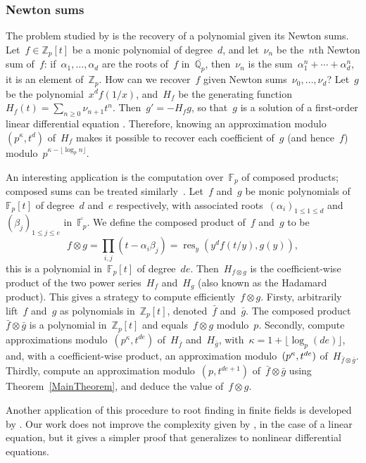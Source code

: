 \documentclass{sig-alternate}
\theoremstyle{definition}
\theoremstyle{remark}
\newcommand{\Zp}{\mathbb{Z}_p}
\newcommand{\Q}{\mathbb{Q}}
\newcommand{\Qp}{\Q_p}
\newcommand{\Fp}{\mathbb{F}_p}
\def\leq{\leqslant}
\def\geq{\geqslant}
\begin{document}
\subsubsection{Newton sums}

The problem studied by \textcite{BosGonPer05} is the recovery of a polynomial given its Newton sums.
Let~$f\in\Zp[t]$ be a monic polynomial of degree~$d$, and let~$\nu_n$ be
the~$n${th} Newton sum of~$f$: if~$\alpha_1,\dotsc, \alpha_d$
are the roots of~$f$ in~$\overline{\Qp}$, then~$\nu_n$ is the
sum~$\alpha_1^n+\dotsb+\alpha_d^n$, it is an element of~$\Zp$.  How can we
recover~$f$ given Newton sums~$\nu_0,\dotsc, \nu_d$?  Let~$g$ be the polynomial~$x^d
f(1/x)$, and~$H_f$ be the generating function~$H_f(t) = \sum_{n\geq 0} \nu_{n+1}
t^n$.  Then~$g' = -H_f g$, so that~$g$ is a solution of a first-order linear
differential equation \parencite{Sch93}.  Therefore, knowing an approximation modulo~$(p^\kappa,
t^d)$ of~$H_f$ makes it possible to recover each coefficient of~$g$ (and hence~$f$) modulo~$p^{\kappa - \lfloor\log_p n\rfloor}$.

An interesting application is the computation over~$\Fp$ of composed products;
composed sums can be treated similarly~\parencite{BosGonPer05}.  Let~$f$ and~$g$ be monic polynomials
of~$\Fp[t]$ of degree~$d$ and~$e$ respectively, with associated
roots~$(\alpha_i)_{1\leq 1 \leq d}$ and~$(\beta_j)_{1\leq j\leq e}$
in~$\overline{\Fp}$.  We define the composed product of~$f$ and~$g$ to be
\[ f\otimes g = \prod_{i,j}(t - \alpha_i \beta_j ) = \mathop{res}_y(y^d f(t/y), g(y)), \]
this is a polynomial in~$\Fp[t]$ of degree~$de$.  Then~$H_{f\otimes g}$ is the
coefficient-wise product of the two power series~$H_f$ and~$H_g$ (also known as the Hadamard product).  This gives a
strategy to compute efficiently~$f\otimes g$.  Firsty, arbitrarily lift~$f$
and~$g$ as polynomials in~$\Zp[t]$, denoted~$\bar f$ and~$\bar g$. The composed
product~$\bar f \otimes \bar g$ is a polynomial in~$\Zp[t]$ and equals~$f\otimes g$
modulo~$p$.  Secondly, compute approximations
modulo~$(p^\kappa, t^{de})$ of~$H_{\bar f}$ and~$H_{\bar g}$, with~$\kappa = 1 + \lfloor \log_p(de) \rfloor$, and, with a
coefficient-wise product, an approximation modulo~$( p^\kappa, \smash{t^{de}})$
of~$H_{\bar f \otimes \bar g}$.  Thirdly, compute an approximation
modulo~$(p, t^{de+1})$ of~$\bar f \otimes \bar g$ using
Theorem~\ref{MainTheorem}, and deduce the value of~$f\otimes g$.

Another application of this procedure to root finding in finite fields is developed by \textcite{Grenet:2015}.
Our work does not improve the complexity given by \textcite{BosGonPer05}, in the case of a linear equation, but it
gives a simpler proof that generalizes to nonlinear differential equations.
\end{document}
